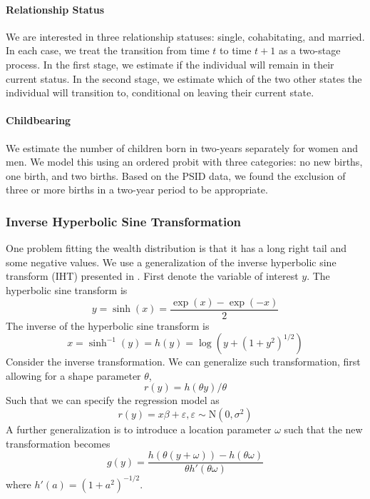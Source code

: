 \paragraph{Relationship Status}
We are interested in three relationship statuses: single, cohabitating, and married.  In each case, we treat the transition
from time $t$ to time $t+1$ as a two-stage process.  In the first stage, we estimate if the individual will remain in their 
current status.  In the second stage, we estimate which of the two other states the individual will transition to, conditional
on leaving their current state.

\paragraph{Childbearing}
We estimate the number of children born in two-years separately for women and men.  We model this using an ordered probit with
three categories: no new births, one birth, and two births.  Based on the PSID data, we found the exclusion of three or more
births in a two-year period to be appropriate.  

\subsubsection{Inverse Hyperbolic Sine Transformation}
One problem fitting the wealth distribution is that it has a long right tail and some negative values. We use a 
generalization of the inverse hyperbolic sine transform (IHT) presented in \citet{mackinnon1990transforming}. First denote the variable of 
interest $y$. The hyperbolic sine transform is 
\begin{equation}
y = \sinh(x) = \frac{\exp(x) - \exp(-x)}{2}
\label{eqn:sinh_y}
\end{equation}
The inverse of the hyperbolic sine transform is
\[
x = \sinh^{-1}(y) = h(y) = \log(y + (1+y^2)^{1/2})
\]
Consider the inverse transformation. We can generalize such transformation, first allowing for a 
shape parameter $\theta$,
\begin{equation}
r(y) = h(\theta y)/\theta
\label{eqn:generalized_ihs_shape}
\end{equation}
Such that we can specify the regression model as
\begin{equation}
r(y) = x\beta + \varepsilon, \varepsilon \sim \mathrm{N}(0, \sigma^2)
\label{eqn:ihs_regression_model}
\end{equation}
A further generalization is to introduce a location parameter $\omega$ such that the new 
transformation becomes
\begin{equation}
g(y) = \frac{h(\theta(y+\omega)) - h(\theta\omega)}{\theta h'(\theta \omega)}
\label{eqn:geralized_ihs_loc_scale}
\end{equation}
where $h'(a) = (1+a^2)^{-1/2}$. 

